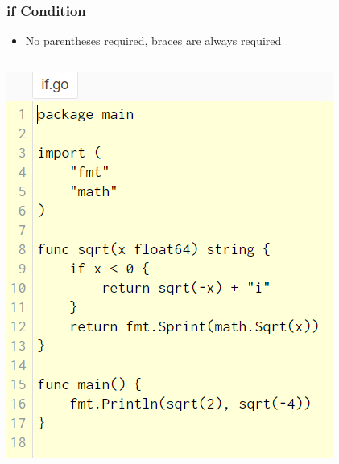 \documentclass[14pt]{beamer}
\begin{document}
{
\begin{frame}
    \frametitle{if Condition}
    \begin{itemize}
        \item No parentheses required, braces are always required
    \end{itemize}
    \begin{columns}
        \begin{column}{0.5\textwidth}
            \includegraphics[width=\linewidth]{img/if.PNG}
        \end{column}
        \begin{column}{0.5\textwidth}

\end{column}
\end{columns}
\end{frame}}
\end{document}
